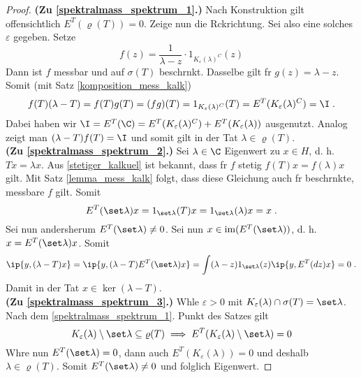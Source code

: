 		\begin{proof}
			\textbf{(Zu \ref{spektralmass_spektrum_1}.)} Nach Konstruktion gilt offensichtlich \(E^T(\varrho(T)) = 0\). Zeige nun die R\us ckrichtung. Sei also eine solches \(\varepsilon\) gegeben. Setze
			\[f(z) = \frac{1}{\lambda - z} \cdot1_{K_\varepsilon(\lambda)^C}(z)\]
			Dann ist $f$ messbar und auf \(\sigma(T)\) beschr\as nkt. Dasselbe gilt f\us r \(g(z) = \lambda - z\). Somit (mit Satz \ref{komposition_mess_kalk}) 
			\[f(T)(\lambda -T) = f(T)g(T) = (fg)(T) = 1_{K_\varepsilon(\lambda)^C}(T) = E^T(K_\varepsilon(\lambda)^C) = \I\;.\]
			Dabei haben wir \(\I = E^T(\C) = E^T(K_\varepsilon(\lambda)^C) + E^T(K_\varepsilon(\lambda))\) ausgenutzt. Analog zeigt man \((\lambda-T)f(T) = \I\) und somit gilt in der Tat \(\lambda \in \varrho(T)\).\\
			\textbf{(Zu \ref{spektralmass_spektrum_2}.)} Sei \(\lambda \in \C\) Eigenwert zu \(x\in H\), d. h. \(Tx = \lambda x\). Aus \ref{stetiger_kalkuel} ist bekannt, dass f\us r $f$ stetig \(f(T)x = f(\lambda)x\) gilt. Mit Satz \ref{lemma_mess_kalk} folgt, dass diese Gleichung auch f\us r beschr\as nkte, messbare $f$ gilt. Somit
			\[E^T(\set\lambda)x = 1_{\set\lambda}(T)x = 1_{\set\lambda}(\lambda)x = x\;.\]
			Sei nun andersherum \(E^T(\set\lambda)\neq 0\). Sei nun \(x\in \text{im}(E^T(\set\lambda))\), d. h. \(x = E^T(\set\lambda) x\). Somit
			\[\ip{y, (\lambda -T)x} = \ip{y, (\lambda-T)E^T(\set\lambda)x} = \int(\lambda-z)1_{\set\lambda}(z)\ip{y, E^T(dz)x} = 0\;.\]
			Damit in der Tat \(x\in \ker(\lambda - T)\).\\
			\textbf{(Zu \ref{spektralmass_spektrum_3}.)} W\as hle \(\varepsilon > 0\) mit \(K_\varepsilon(\lambda)\cap\sigma(T) = \set\lambda\). Nach dem \ref{spektralmass_spektrum_1}. Punkt des Satzes gilt \[K_\varepsilon(\lambda)\setminus\set\lambda\subseteq \varrho(T)\implies E^T(K_\varepsilon(\lambda)\setminus\set\lambda) = 0\]
			W\as hre nun \(E^T(\set\lambda) = 0\), dann auch \(E^T(K_\varepsilon(\lambda)) = 0\) und deshalb \(\lambda\in \varrho(T)\). Somit \(E^T(\set\lambda) \neq 0\) und folglich Eigenwert. 
		\end{proof}
	
